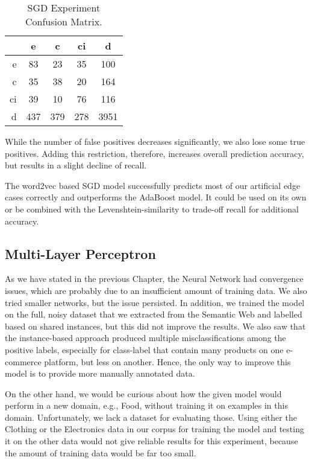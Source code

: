 \begin{table}[htbp]
    \begin{center}
        \begin{tabular}{r|cccc}
            & e & c & ci & d \\
            \hline
            e & 83 & 23 & 35 & 100 \\
            c & 35 & 38 & 20 & 164 \\
            ci & 39 & 10 & 76 & 116 \\
            d & 437 & 379 & 278 & 3951 \\
        \end{tabular}
        \caption{SGD Experiment Confusion Matrix.}
        \label{tab:sgd-experiment-cm}
    \end{center}
\end{table}

While the number of false positives decreases significantly, we also lose some true positives.
Adding this restriction, therefore, increases overall prediction accuracy, but results in a slight decline of
recall.

The word2vec based SGD model successfully predicts most of our artificial edge cases correctly and outperforms the
AdaBoost model.
It could be used on its own or be combined with the Levenshtein-similarity to trade-off recall for additional accuracy.

\subsection{Multi-Layer Perceptron}

As we have stated in the previous Chapter, the Neural Network had convergence issues, which are probably due to an
insufficient amount of training data.
We also tried smaller networks, but the issue persisted.
In addition, we trained the model on the full, noisy dataset that we extracted from the Semantic Web and labelled based
on shared instances, but  this did not improve the results.
We also saw that the instance-based approach produced multiple misclassifications among the positive labels, especially
for class-label that contain many products on one e-commerce platform, but less on another.
Hence, the only way to improve this model is to provide more manually annotated data.

On the other hand, we would be curious about how the given model would perform in a new domain, e.g., Food, without
training it on examples in this domain.
Unfortunately, we lack a dataset for evaluating those.
Using either the Clothing or the Electronics data in our corpus for training the model and testing it on the other
data would not give reliable results for this experiment, because the amount of training data would be far too small.

